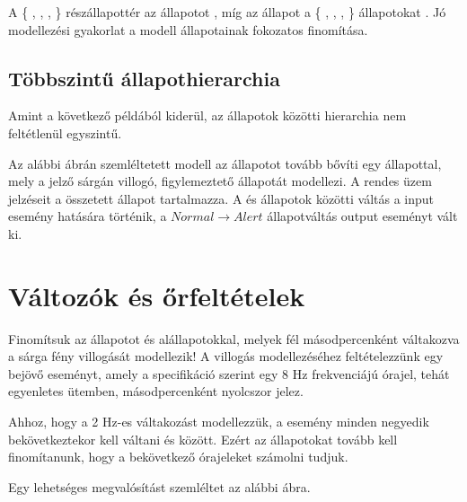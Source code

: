 A \{ , , ,  \} részállapottér az  állapotot , míg az  állapot a \{ , , ,  \} állapotokat . Jó modellezési gyakorlat a modell állapotainak fokozatos finomítása.

\subsection{Többszintű állapothierarchia}

Amint a következő példából kiderül, az állapotok közötti hierarchia nem feltétlenül egyszintű.

\begin{megjegyzes}
Az alábbi ábrán szemléltetett modell az  állapotot tovább bővíti egy  állapottal, mely a jelző sárgán villogó, figylemeztető állapotát modellezi. A rendes üzem jelzéseit a  összetett állapot tartalmazza. A  és  állapotok közötti váltás a  input esemény hatására történik, a $\mathit{Normal} \rightarrow \mathit{Alert}$ állapotváltás  output eseményt vált ki.

\end{megjegyzes}

\section{Változók és őrfeltételek}

Finomítsuk az  állapotot  és  alállapotokkal, melyek fél másodpercenként váltakozva a sárga fény villogását modellezik!
A villogás modellezéséhez feltételezzünk egy  bejövő eseményt, amely a specifikáció szerint egy 8 Hz frekvenciájú órajel, tehát egyenletes ütemben, másodpercenként nyolcszor jelez.

Ahhoz, hogy a 2 Hz-es váltakozást modellezzük, a  esemény minden negyedik bekövetkeztekor kell váltani  és  között. Ezért az állapotokat tovább kell finomítanunk, hogy a bekövetkező órajeleket számolni tudjuk.

Egy lehetséges megvalósítást szemléltet az alábbi ábra.

